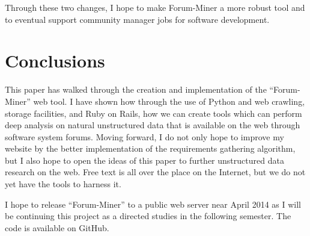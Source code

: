 \documentclass[conference]{IEEEtran}
\begin{document}
Through these two changes, I hope to make Forum-Miner a more robust tool and to eventual support community manager
jobs for software development.

\section{Conclusions}
\label{sec:conc}

This paper has walked through the creation and implementation of the ``Forum-Miner'' web tool. I have shown
how through the use of Python and web crawling, storage facilities, and Ruby on Rails, how we can create tools
which can perform deep analysis on natural unstructured data
that is available on the web through software system forums. Moving forward, I do not only hope to improve my
website by the better implementation of the requirements gathering algorithm, but I also hope to open the ideas
of this paper to further unstructured data research on the web. Free text is all over the place on the Internet,
but we do not yet have the tools to harness it.

I hope to release ``Forum-Miner'' to a public web server near April 2014 as I will be continuing this project
as a directed studies in the following semester. The code is available on GitHub.





\end{document}
